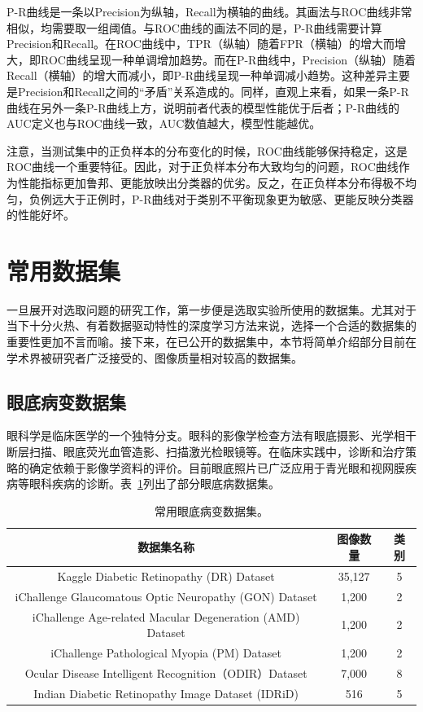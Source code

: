 P-R曲线是一条以Precision为纵轴，Recall为横轴的曲线。其画法与ROC曲线非常相似，均需要取一组阈值。与ROC曲线的画法不同的是，P-R曲线需要计算Precision和Recall。在ROC曲线中，TPR（纵轴）随着FPR（横轴）的增大而增大，即ROC曲线呈现一种单调增加趋势。而在P-R曲线中，Precision（纵轴）随着Recall（横轴）的增大而减小，即P-R曲线呈现一种单调减小趋势。这种差异主要是Precision和Recall之间的“矛盾”关系造成的。同样，直观上来看，如果一条P-R曲线在另外一条P-R曲线上方，说明前者代表的模型性能优于后者；P-R曲线的AUC定义也与ROC曲线一致，AUC数值越大，模型性能越优。

注意，当测试集中的正负样本的分布变化的时候，ROC曲线能够保持稳定，这是ROC曲线一个重要特征。因此，对于正负样本分布大致均匀的问题，ROC曲线作为性能指标更加鲁邦、更能放映出分类器的优劣。反之，在正负样本分布得极不均匀，负例远大于正例时，P-R曲线对于类别不平衡现象更为敏感、更能反映分类器的性能好坏。
\section{常用数据集}\label{sec:usually_ds_intro}
一旦展开对选取问题的研究工作，第一步便是选取实验所使用的数据集。尤其对于当下十分火热、有着数据驱动特性的深度学习方法来说，选择一个合适的数据集的重要性更加不言而喻。接下来，在已公开的数据集中，本节将简单介绍部分目前在学术界被研究者广泛接受的、图像质量相对较高的数据集。

\subsection{眼底病变数据集}\label{subsec:original_dr_dataset_intro}
眼科学是临床医学的一个独特分支。眼科的影像学检查方法有眼底摄影、光学相干断层扫描、眼底荧光血管造影、扫描激光检眼镜等。在临床实践中，诊断和治疗策略的确定依赖于影像学资料的评价。目前眼底照片已广泛应用于青光眼和视网膜疾病等眼科疾病的诊断。表~\ref{tab:datasets_info}列出了部分眼底病数据集。
\begin{table}[h]
	\centering
	\caption[常用眼底病变数据集]{常用眼底病变数据集。}
	\label{tab:datasets_info}
	\begin{tabular}{c|c|c}
		\toprule[2pt]
		数据集名称 & 图像数量 & 类别 \\
		\midrule[2pt]
		Kaggle Diabetic Retinopathy (DR) Dataset	& 35,127	& 5	 \\
		\hline                         
		iChallenge Glaucomatous Optic Neuropathy (GON) Dataset   & 1,200    & 2 \\ \hline
		iChallenge Age-related Macular Degeneration (AMD) Dataset & 1,200    & 2  \\ \hline
		iChallenge Pathological Myopia (PM)   Dataset            & 1,200    & 2 \\ \hline
		Ocular Disease Intelligent Recognition（ODIR）Dataset & 7,000 & 8 \\ \hline
		
		Indian Diabetic Retinopathy Image Dataset (IDRiD) & 516 & 5  \\
		\bottomrule[2pt]
	\end{tabular}
\end{table}

